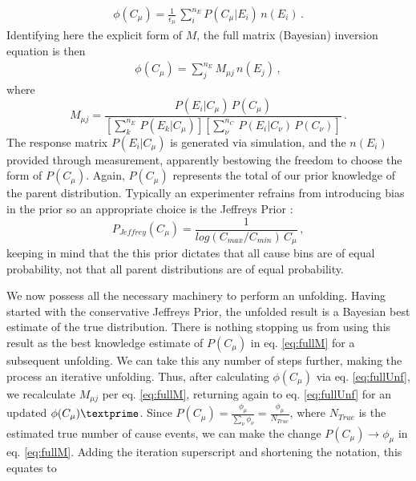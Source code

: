 \begin{equation}
 \begin{split}
  \phi(C_{\mu}) = \frac{1}{\epsilon_{\mu}} \, \sum_{i}^{n_{E}} P(C_{\mu}|E_{i}) \, n(E_{i}) \, .
 \end{split}
\end{equation}
Identifying here the explicit form of $M$, the full matrix (Bayesian) inversion equation is then 
\begin{equation} \label{eq:fullUnf}
 \begin{split}
  \phi(C_{\mu}) = \sum_{j}^{n_E}M_{\mu j} \, n(E_{j}) \, ,
 \end{split}
\end{equation}
where 
\begin{equation} \label{eq:fullM}
	M_{\mu j}= \frac{P(E_{i}|C_{\mu}) \, P(C_{\mu})}{[\sum_{k}^{n_{E}} \, P(E_{k}|C_{\mu})][\sum_{\nu}^{n_{C}} \, P(E_{i}|C_{\nu}) \, P(C_{\nu})]} \, .
\end{equation}
The response matrix $P(E_{i}|C_{\mu})$ is generated via simulation, and the $n(E_{i})$ provided through measurement, 
apparently bestowing the freedom to choose the form of $P(C_{\mu})$. Again, $P(C_{\mu})$ represents the total of our prior knowledge 
of the parent distribution. Typically an experimenter refrains from introducing bias in the prior
so an appropriate choice is the Jeffreys Prior \cite{jeffreys}:
\begin{equation*} \label{eq:JeffPrior}
  P_{Jeffrey}(C_{\mu}) = \frac{1}{log(C_{max}/C_{min}) \, C_{\mu}} \, ,
\end{equation*}
keeping in mind that the this prior dictates that all cause bins are of equal probability, not that all parent distributions are of equal probability.

We now possess all the necessary machinery to perform an unfolding. Having started with the conservative Jeffreys Prior,
the unfolded result is a Bayesian best estimate of the true distribution. There is nothing stopping us from using this result as 
the best knowledge estimate of $P(C_{\mu})$ in eq. \ref{eq:fullM} for a subsequent unfolding. We can take this any number of steps further, 
making the process an iterative unfolding. Thus, after calculating $\phi(C_{\mu})$ via eq. \ref{eq:fullUnf}, 
we recalculate $M_{\mu j}$ per eq. \ref{eq:fullM}, returning again to eq. \ref{eq:fullUnf} for an updated $\phi(C_{\mu})\textprime$.
Since $P(C_{\mu}) = \frac{\phi_{\mu}}{\sum_{\nu}{\phi_{\nu}}} = \frac{\phi_{\mu}}{N_{True}}$, where $N_{True}$ is the estimated true number of 
cause events, we can make the change $P(C_{\mu}) \rightarrow \phi_{\mu}$ in eq. \ref{eq:fullM}. 
Adding the iteration superscript and shortening the notation, this equates to

